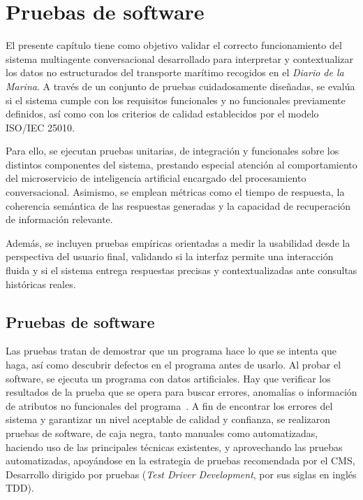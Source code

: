 \chapter{Pruebas de software}
\label{chap:chapter3}


El presente capítulo tiene como objetivo validar el correcto funcionamiento del sistema multiagente conversacional desarrollado para interpretar y contextualizar los datos no estructurados del transporte marítimo recogidos en el \textit{Diario de la Marina}. A través de un conjunto de pruebas cuidadosamente diseñadas, se evalúa si el sistema cumple con los requisitos funcionales y no funcionales previamente definidos, así como con los criterios de calidad establecidos por el modelo ISO/IEC 25010.

Para ello, se ejecutan pruebas unitarias, de integración y funcionales sobre los distintos componentes del sistema, prestando especial atención al comportamiento del microservicio de inteligencia artificial encargado del procesamiento conversacional. Asimismo, se emplean métricas como el tiempo de respuesta, la coherencia semántica de las respuestas generadas y la capacidad de recuperación de información relevante.

Además, se incluyen pruebas empíricas orientadas a medir la usabilidad desde la perspectiva del usuario final, validando si la interfaz permite una interacción fluida y si el sistema entrega respuestas precisas y contextualizadas ante consultas históricas reales.

\section{Pruebas de software}

Las pruebas tratan de demostrar que un programa hace lo que se intenta que haga, así como descubrir defectos en el programa antes de usarlo. Al probar el software, se ejecuta un programa con datos artificiales. Hay que verificar los resultados de la prueba que se opera para buscar errores, anomalías o información de atributos no funcionales del
programa~\cite{sommerville2011software}. A fin de encontrar los errores del sistema y garantizar un nivel aceptable de calidad y confianza, se realizaron pruebas de software, de caja negra, tanto manuales como automatizadas, haciendo uso de las principales técnicas existentes, y aprovechando las pruebas automatizadas, apoyándose en la estrategia de pruebas recomendada por el CMS, Desarrollo dirigido por pruebas (\textit{Test Driver Development}, por sus siglas en inglés TDD).

